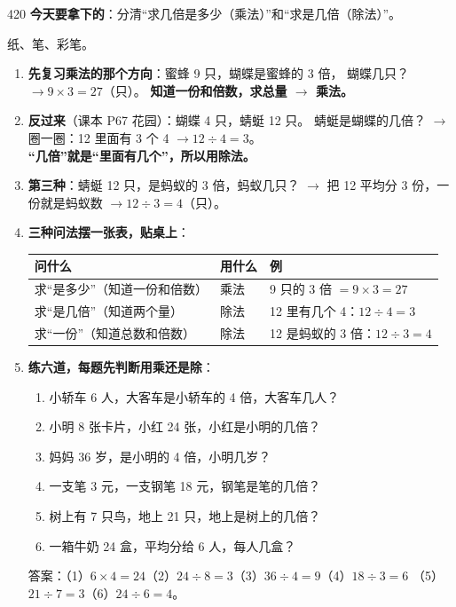 \begin{lesson}{4}{20}
\textbf{今天要拿下的}：分清“求几倍是多少（乘法）”和“求是几倍（除法）”。

\begin{materials}
纸、笔、彩笔。
\end{materials}

\begin{enumerate}
  \item \textbf{先复习乘法的那个方向}：蜜蜂 9 只，蝴蝶是蜜蜂的 3 倍，
        蝴蝶几只？$\to 9\times3=27$（只）。
        \textbf{知道一份和倍数，求总量 $\to$ 乘法。}
  \item \textbf{反过来}（课本 P67 花园）：蝴蝶 4 只，蜻蜓 12 只。
        蜻蜓是蝴蝶的几倍？
        $\to$ 圈一圈：12 里面有 3 个 4 $\to 12\div4=3$。\\
        \textbf{“几倍”就是“里面有几个”，所以用除法。}
  \item \textbf{第三种}：蜻蜓 12 只，是蚂蚁的 3 倍，蚂蚁几只？
        $\to$ 把 12 平均分 3 份，一份就是蚂蚁数 $\to 12\div3=4$（只）。
  \item \textbf{三种问法摆一张表，贴桌上}：
        \begin{center}
        \small
        \begin{tabularx}{\linewidth}{@{}p{6.4cm}p{3.4cm}X@{}}
        \toprule
        \textbf{问什么} & \textbf{用什么} & \textbf{例} \\
        \midrule
        求“是多少”（知道一份和倍数） & 乘法 & 9 只的 3 倍 $=9\times3=27$ \\
        求“是几倍”（知道两个量） & 除法 & 12 里有几个 4：$12\div4=3$ \\
        求“一份”（知道总数和倍数） & 除法 & 12 是蚂蚁的 3 倍：$12\div3=4$ \\
        \bottomrule
        \end{tabularx}
        \end{center}
  \item \textbf{练六道，每题先判断用乘还是除}：
        \begin{enumerate}[label=（\arabic*）,itemsep=2pt]
          \item 小轿车 6 人，大客车是小轿车的 4 倍，大客车几人？
          \item 小明 8 张卡片，小红 24 张，小红是小明的几倍？
          \item 妈妈 36 岁，是小明的 4 倍，小明几岁？
          \item 一支笔 3 元，一支钢笔 18 元，钢笔是笔的几倍？
          \item 树上有 7 只鸟，地上 21 只，地上是树上的几倍？
          \item 一箱牛奶 24 盒，平均分给 6 人，每人几盒？
        \end{enumerate}
        答案：（1）$6\times4=24$（2）$24\div8=3$（3）$36\div4=9$（4）$18\div3=6$
        （5）$21\div7=3$（6）$24\div6=4$。
\end{enumerate}


\end{lesson}
